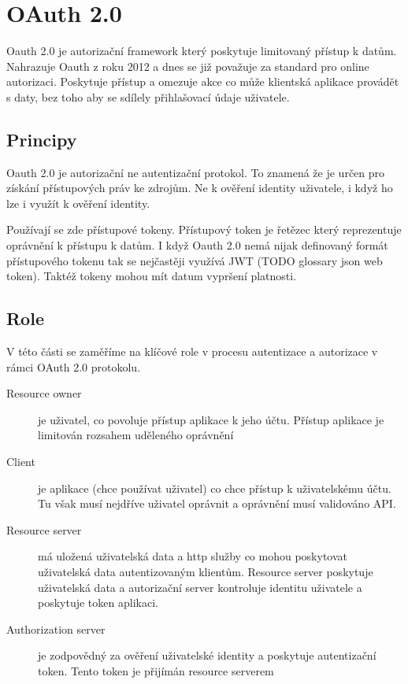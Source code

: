 \section{OAuth 2.0}
Oauth 2.0 je autorizační framework který poskytuje limitovaný přístup k datům. Nahrazuje Oauth z roku 2012 a dnes se již považuje za standard pro online autorizaci. Poskytuje přístup a omezuje akce co může klientská aplikace provádět s daty, bez toho aby se sdílely přihlašovací údaje uživatele.


\subsection{Principy}
Oauth 2.0 je autorizační ne autentizační protokol. To znamená že je určen pro získání přístupových práv ke zdrojům. Ne k ověření identity uživatele, i když ho lze i využít k ověření identity.

Používají se zde přístupové tokeny. Přístupový token je řetězec který reprezentuje oprávnění k přístupu k datům. I když Oauth 2.0 nemá nijak definovaný formát přístupového tokenu tak se nejčastěji využívá JWT (TODO glossary json web token). Taktéž tokeny mohou mít datum vypršení platnosti.

\subsection{Role}\label{sec:Oauth_roles}
V této části se zaměříme na klíčové role v procesu autentizace a autorizace v rámci OAuth 2.0 protokolu.


\begin{description}
    \item[Resource owner] je uživatel, co povoluje přístup aplikace k jeho účtu. Přístup aplikace je limitován rozsahem uděleného oprávnění
    \item[Client] je aplikace (chce používat uživatel) co chce přístup k uživatelskému účtu. Tu však musí nejdříve uživatel oprávnit a oprávnění musí validováno API.
    \item[Resource server] má uložená uživatelská data a http služby co mohou poskytovat uživatelská data autentizovaným klientům. Resource server poskytuje uživatelská data a autorizační server kontroluje identitu uživatele a poskytuje token aplikaci.
    \item[Authorization server] je zodpovědný za ověření uživatelské identity a poskytuje autentizační token. Tento token je přijímán resource serverem
\end{description}

